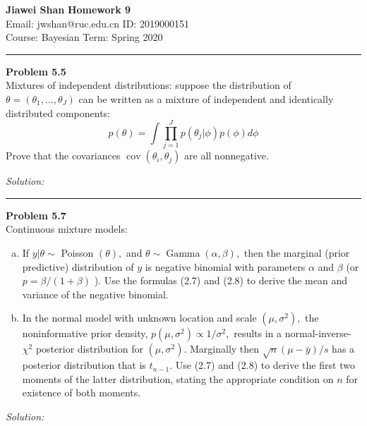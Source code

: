 \documentclass[a4paper, 11pt]{article}
\newenvironment{problem}[2][Problem]
    { \begin{mdframed}[backgroundcolor=gray!20] \textbf{#1 #2} \\}
    {  \end{mdframed}}
\newenvironment{solution}
    {\textit{Solution:}}
    {}
\begin{document}
\noindent
\large\textbf{Jiawei Shan} \hfill \textbf{Homework 9}   \\
Email: jwshan@ruc.edu.cn \hfill ID: 2019000151 \\
\normalsize Course: Bayesian \hfill Term: Spring 2020\\
\noindent\rule{7in}{2.8pt}



\begin{problem}{5.5}
  Mixtures of independent distributions: suppose the distribution of $\theta=\left(\theta_{1}, \ldots, \theta_{J}\right)$ can be written as a mixture of independent and identically distributed components:
  $$
  p(\theta)=\int \prod_{j=1}^{J} p\left(\theta_{j} | \phi\right) p(\phi) d \phi
  $$
  Prove that the covariances $\operatorname{cov}\left(\theta_{i}, \theta_{j}\right)$ are all nonnegative.
\end{problem}
\begin{solution}

\end{solution}

\noindent\rule{7in}{2.8pt}
\begin{problem}{5.7}
  Continuous mixture models:
  \begin{enumerate}[(a)]
    \item  If $y | \theta \sim$ Poisson $(\theta),$ and $\theta \sim \operatorname{Gamma}(\alpha, \beta),$ then the marginal (prior predictive) distribution of $y$ is negative binomial with parameters $\alpha$ and $\beta$ (or $p=\beta /(1+\beta)$ ). Use the formulas (2.7) and (2.8) to derive the mean and variance of the negative binomial.
    \item In the normal model with unknown location and scale $\left(\mu, \sigma^{2}\right),$ the noninformative prior density, $p\left(\mu, \sigma^{2}\right) \propto 1 / \sigma^{2},$ results in a normal-inverse- $\chi^{2}$ posterior distribution for $\left(\mu, \sigma^{2}\right) .$ Marginally then $\sqrt{n}(\mu-\bar{y}) / s$ has a posterior distribution that is $t_{n-1} .$
    Use (2.7) and (2.8) to derive the first two moments of the latter distribution, stating the appropriate condition on $n$ for existence of both moments.
  \end{enumerate}
\end{problem}
\begin{solution}

\end{solution}
\end{document}
